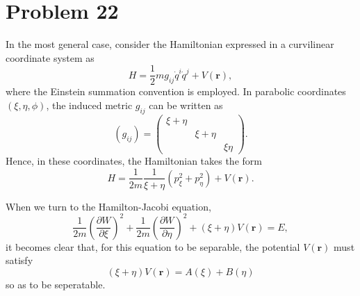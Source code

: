 \section*{Problem 22}   

    In the most general case, consider the Hamiltonian expressed in a curvilinear coordinate system as
    \begin{equation*}
        H = \frac{1}{2} m g_{ij} \dot{q}^i \dot{q}^j  +  V\left(\boldsymbol{r}\right),
    \end{equation*}
    where the Einstein summation convention is employed. In parabolic coordinates $(\xi, \eta, \phi)$, the induced metric $g_{ij}$ can be written as
    \begin{equation}
        \left(g_{ij}\right)  = \left(
        \begin{matrix}
            \xi + \eta  &               &           \\
                        & \xi + \eta    &           \\
                        &               &  \xi\eta
        \end{matrix}
        \right).
    \end{equation}
    Hence, in these coordinates, the Hamiltonian takes the form
    \begin{equation}
        H = \frac{1}{2m} \frac{1}{\xi+\eta} \left( p_\xi^2 + p_\eta^2 \right)  +  V\left(\boldsymbol{r}\right).
    \end{equation}

    When we turn to the Hamilton-Jacobi equation,
    \begin{equation}
        \frac{1}{2m} \left(\frac{\partial W}{\partial\xi}\right)^2 + \frac{1}{2m} \left(\frac{\partial W}{\partial\eta}\right)^2  +  \left(\xi+\eta\right)V\left(\boldsymbol{r}\right) = E,
    \end{equation}
    it becomes clear that, for this equation to be separable, the potential $V(\mathbf{r})$ must satisfy
    \begin{equation}
        \left(\xi+\eta\right)V\left(\boldsymbol{r}\right) = A\left(\xi\right) + B\left(\eta\right)
    \end{equation}
    so as to be seperatable.
